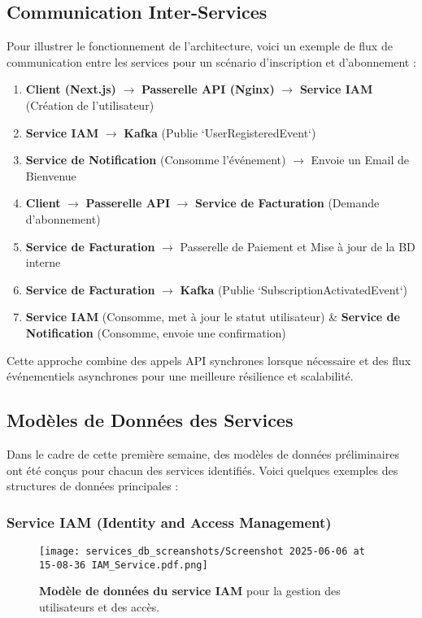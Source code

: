 \subsection{Communication Inter-Services}
Pour illustrer le fonctionnement de l'architecture, voici un exemple de flux de communication entre les services pour un scénario d'inscription et d'abonnement :
\begin{enumerate}
  \item \textbf{Client (Next.js)} $\rightarrow$ \textbf{Passerelle API (Nginx)} $\rightarrow$ \textbf{Service IAM} (Création de l'utilisateur)
  \item \textbf{Service IAM} $\rightarrow$ \textbf{Kafka} (Publie `UserRegisteredEvent`)
  \item \textbf{Service de Notification} (Consomme l'événement) $\rightarrow$ Envoie un Email de Bienvenue
  \item \textbf{Client} $\rightarrow$ \textbf{Passerelle API} $\rightarrow$ \textbf{Service de Facturation} (Demande d'abonnement)
  \item \textbf{Service de Facturation} $\rightarrow$ Passerelle de Paiement et Mise à jour de la BD interne
  \item \textbf{Service de Facturation} $\rightarrow$ \textbf{Kafka} (Publie `SubscriptionActivatedEvent`)
  \item \textbf{Service IAM} (Consomme, met à jour le statut utilisateur) \& \textbf{Service de Notification} (Consomme, envoie une confirmation)
\end{enumerate}

Cette approche combine des appels API synchrones lorsque nécessaire et des flux événementiels asynchrones pour une meilleure résilience et scalabilité.

\subsection{Modèles de Données des Services}
Dans le cadre de cette première semaine, des modèles de données préliminaires ont été conçus pour chacun des services identifiés. Voici quelques exemples des structures de données principales :

\newpage
\subsubsection{Service IAM (Identity and Access Management)}
\begin{figure}[h!]
  \centering
  \texttt{[image: services\_db\_screanshots/Screenshot 2025-06-06 at 15-08-36 IAM\_Service.pdf.png]}
  \caption{\textbf{Modèle de données du service IAM} pour la gestion des utilisateurs et des accès.}
  \label{fig:iam_service}
\end{figure}
\vspace{-10pt}
\small
